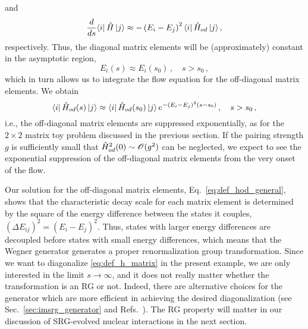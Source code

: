 and
\begin{align}
   \frac{d {}} {d {s}} \langle{i}|\,{\hat{H}}\,|{j}\rangle
  \approx-\left(E_i-E_j\right)^2\langle{i}|\,{\hat{H}_{od}}\,|{j}\rangle\,,
\end{align}
respectively. Thus, the diagonal matrix elements will be (approximately)
constant in the asymptotic region,
\begin{equation}
  E_i(s) \approx E_i(s_0)\,,\quad s>s_0\,,
\end{equation}
which in turn allows us to integrate the flow equation for the off-diagonal
matrix elements. We obtain
\begin{equation}\label{eq:def_hod_general}
  \matrixe{i}{\HO_{od}(s)}{j} \approx \matrixe{i}{\HO_{od}(s_0)}{j}\,e^{-(E_i-E_j)^2 (s-s_0)}\,, \quad s>s_0\,,
\end{equation}
i.e., the off-diagonal matrix elements are suppressed exponentially, as for the
$2\times2$ matrix toy problem discussed in the previous section. If the pairing
strength $g$ is sufficiently small that $\hat{H}^2_{od}(0)\sim \mathcal{O}(g^2)$ can 
be neglected, we expect to see the exponential suppression of the off-diagonal 
matrix elements from the very onset of the flow. 

Our solution for the off-diagonal matrix elements, Eq.~\eqref{eq:def_hod_general},
shows that the characteristic decay scale for each matrix element is determined 
by the square of the energy difference between the states it couples, 
$(\Delta E_{ij})^2 = (E_i-E_j)^2$. Thus, states with larger energy differences
are decoupled before states with small energy differences, which means that 
the Wegner generator generates a proper renormalization group transformation.
Since we want to diagonalize \eqref{eq:def_h_matrix} in the present example,
we are only interested in the limit $s\to\infty$, and it does not really matter
whether the transformation is an RG or not. Indeed, there are alternative choices
for the generator which are more efficient in achieving the desired diagonalization
(see Sec.~\ref{sec:imsrg_generator} and Refs.~\cite{Hergert:2016jk,Hergert:2017kx}).
The RG property will matter in our discussion of SRG-evolved nuclear interactions 
in the next section.

%
%
